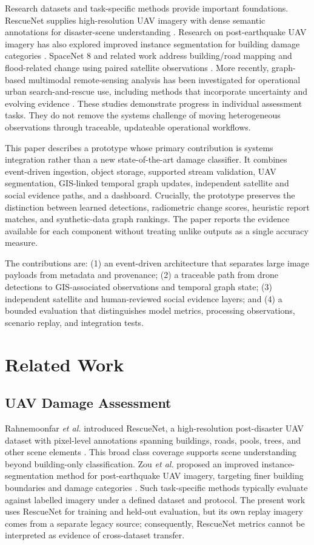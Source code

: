 \documentclass[conference]{IEEEtran}
\begin{document}
Research datasets and task-specific methods provide important foundations. RescueNet supplies high-resolution UAV imagery with dense semantic annotations for disaster-scene understanding \cite{resc}. Research on post-earthquake UAV imagery has also explored improved instance segmentation for building damage categories \cite{zou}. SpaceNet 8 and related work address building/road mapping and flood-related change using paired satellite observations \cite{spacenet}. More recently, graph-based multimodal remote-sensing analysis has been investigated for operational urban search-and-rescue use, including methods that incorporate uncertainty and evolving evidence \cite{selva}. These studies demonstrate progress in individual assessment tasks. They do not remove the systems challenge of moving heterogeneous observations through traceable, updateable operational workflows.

This paper describes a prototype whose primary contribution is systems integration rather than a new state-of-the-art damage classifier. It combines event-driven ingestion, object storage, supported stream validation, UAV segmentation, GIS-linked temporal graph updates, independent satellite and social evidence paths, and a dashboard. Crucially, the prototype preserves the distinction between learned detections, radiometric change scores, heuristic report matches, and synthetic-data graph rankings. The paper reports the evidence available for each component without treating unlike outputs as a single accuracy measure.

The contributions are: (1) an event-driven architecture that separates large image payloads from metadata and provenance; (2) a traceable path from drone detections to GIS-associated observations and temporal graph state; (3) independent satellite and human-reviewed social evidence layers; and (4) a bounded evaluation that distinguishes model metrics, processing observations, scenario replay, and integration tests.

\section{Related Work}
\subsection{UAV Damage Assessment}
Rahnemoonfar \emph{et al.} introduced RescueNet, a high-resolution post-disaster UAV dataset with pixel-level annotations spanning buildings, roads, pools, trees, and other scene elements \cite{resc}. This broad class coverage supports scene understanding beyond building-only classification. Zou \emph{et al.} proposed an improved instance-segmentation method for post-earthquake UAV imagery, targeting finer building boundaries and damage categories \cite{zou}. Such task-specific methods typically evaluate against labelled imagery under a defined dataset and protocol. The present work uses RescueNet for training and held-out evaluation, but its own replay imagery comes from a separate legacy source; consequently, RescueNet metrics cannot be interpreted as evidence of cross-dataset transfer.
\end{document}
